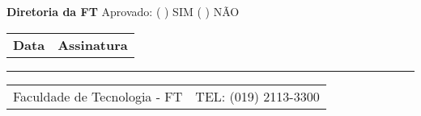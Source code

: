 \documentclass[10pt, a4paper]{article}
\begin{document}
\vspace{0.3cm}
\textbf{Diretoria da FT} \hspace{1cm} Aprovado: ( \quad ) SIM \hspace{0.5cm} ( \quad ) NÃO

\vspace{0.5cm}
\begin{tabularx}{\textwidth}{@{}p{5cm} X@{}}
    \textbf{Data} \hspace{0.5cm} \underline{\hspace{3.5cm}} & \textbf{Assinatura} \hspace{0.5cm} \underline{\hspace{6.6cm}} \\
\end{tabularx}

\vfill
\begin{center}
    \hrule
    \vspace{0.1cm}
    {\scriptsize
        \begin{tabularx}{\textwidth}{X r}
            Faculdade de Tecnologia - FT & TEL: (019) 2113-3300 \\
        \end{tabularx}
    }
\end{center}
\end{document}

